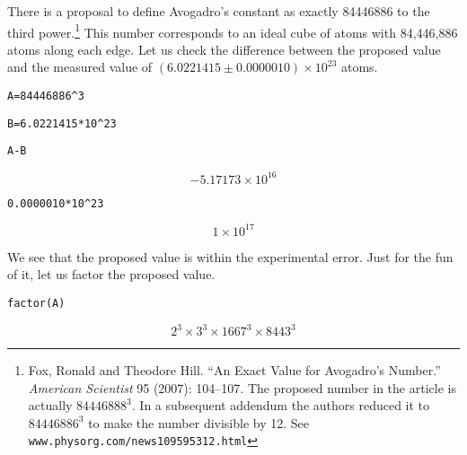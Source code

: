\noindent
There is a proposal to define Avogadro's constant as exactly
84446886 to the third power.\footnote{Fox, Ronald and Theodore Hill.
``An Exact Value for Avogadro's Number.''
{\it American Scientist} 95 (2007): 104--107.
The proposed number in the article is actually $84446888^3$.
In a subsequent addendum the authors reduced it to $84446886^3$ to make the
number divisible by 12. See {\tt www.physorg.com/news109595312.html}}
This number corresponds to an ideal cube of atoms with 84,446,886
atoms along each edge.
Let us check the difference between the proposed value and the measured value
of $(6.0221415\pm0.0000010)\times10^{23}$ atoms.

\medskip
\verb$A=84446886^3$

\verb$B=6.0221415*10^23$

\verb$A-B$

$$-5.17173\times10^{16}$$

\verb$0.0000010*10^23$

$$1\times10^{17}$$

\medskip
\noindent
We see that the proposed value is within the experimental error.
Just for the fun of it, let us factor the proposed value.

\medskip
\verb$factor(A)$

$$2^3\times3^3\times1667^3\times8443^3$$

